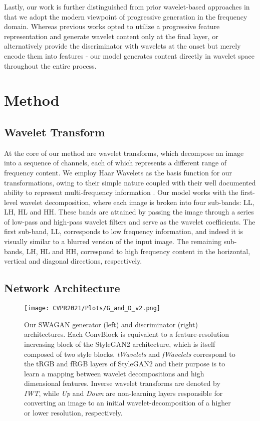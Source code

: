 \documentclass[final]{CVPR2021/cvpr}
\begin{document}
Lastly, our work is further distinguished from prior wavelet-based approaches in that we adopt the modern viewpoint of progressive generation in the frequency domain. Whereas previous works opted to utilize a progressive feature representation and generate wavelet content only at the final layer, or alternatively provide the discriminator with wavelets at the onset but merely encode them into features - our model generates content directly in wavelet space throughout the entire process. 
\section{Method}
\label{sec:method}



\subsection{Wavelet Transform}
At the core of our method are wavelet transforms, which decompose an image into a sequence of channels, each of which represents a different range of frequency content.
We employ Haar Wavelets as the basis function for our transformations, owing to their simple nature coupled with their well documented ability to represent multi-frequency information \citep{daubechies1990wavelet,daubechies1992ten}. Our model works with the first-level wavelet decomposition, where each image is broken into four sub-bands: LL, LH, HL and HH. These bands are attained by passing the image through a series of low-pass and high-pass wavelet filters and serve as the wavelet coefficients. The first sub-band, LL, corresponds to low frequency information, and indeed it is visually similar to a blurred version of the input image. The remaining sub-bands, LH, HL and HH, correspond to high frequency content in the horizontal, vertical and diagonal directions, respectively.

\subsection{Network Architecture}

\begin{figure*}
\begin{center}
\texttt{[image: CVPR2021/Plots/G\_and\_D\_v2.png]}
\end{center}
   \caption{Our SWAGAN generator (left) and discriminator (right) architectures. Each ConvBlock is equivalent to a feature-resolution increasing block of the StyleGAN2 architecture, which is itself composed of two style blocks. \textit{tWavelets} and \textit{fWavelets} correspond to the tRGB and fRGB layers of StyleGAN2 and their purpose is to learn a mapping between wavelet decompositions and high dimensional features. Inverse wavelet transforms are denoted by \textit{IWT}, while \textit{Up} and \textit{Down} are non-learning layers responsible for converting an image to an initial wavelet-decomposition of a higher or lower resolution, respectively.}
\label{fig:Architecture}
\end{figure*}
\end{document}
